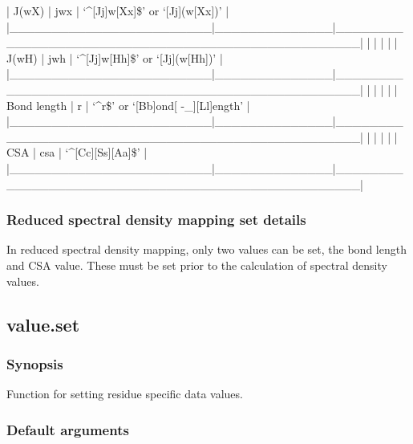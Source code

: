 | J(wX)                  | jwx          | `\^{}[Jj]w[Xx]\$' or `[Jj](w[Xx])'                   |
|\_\_\_\_\_\_\_\_\_\_\_\_\_\_\_\_\_\_\_\_\_\_\_\_|\_\_\_\_\_\_\_\_\_\_\_\_\_\_|\_\_\_\_\_\_\_\_\_\_\_\_\_\_\_\_\_\_\_\_\_\_\_\_\_\_\_\_\_\_\_\_\_\_\_\_\_\_\_\_\_\_\_\_\_\_\_\_\_\_|
|                        |              |                                                  |
| J(wH)                  | jwh          | `\^{}[Jj]w[Hh]\$' or `[Jj](w[Hh])'                   |
|\_\_\_\_\_\_\_\_\_\_\_\_\_\_\_\_\_\_\_\_\_\_\_\_|\_\_\_\_\_\_\_\_\_\_\_\_\_\_|\_\_\_\_\_\_\_\_\_\_\_\_\_\_\_\_\_\_\_\_\_\_\_\_\_\_\_\_\_\_\_\_\_\_\_\_\_\_\_\_\_\_\_\_\_\_\_\_\_\_|
|                        |              |                                                  |
| Bond length            | r            | `\^{}r\$' or `[Bb]ond[ -\_][Ll]ength'                 |
|\_\_\_\_\_\_\_\_\_\_\_\_\_\_\_\_\_\_\_\_\_\_\_\_|\_\_\_\_\_\_\_\_\_\_\_\_\_\_|\_\_\_\_\_\_\_\_\_\_\_\_\_\_\_\_\_\_\_\_\_\_\_\_\_\_\_\_\_\_\_\_\_\_\_\_\_\_\_\_\_\_\_\_\_\_\_\_\_\_|
|                        |              |                                                  |
| CSA                    | csa          | `\^{}[Cc][Ss][Aa]\$'                                 |
|\_\_\_\_\_\_\_\_\_\_\_\_\_\_\_\_\_\_\_\_\_\_\_\_|\_\_\_\_\_\_\_\_\_\_\_\_\_\_|\_\_\_\_\_\_\_\_\_\_\_\_\_\_\_\_\_\_\_\_\_\_\_\_\_\_\_\_\_\_\_\_\_\_\_\_\_\_\_\_\_\_\_\_\_\_\_\_\_\_|



\subsubsection{Reduced spectral density mapping set details}

In reduced spectral density mapping, only two values can be set, the bond length and CSA
value.  These must be set prior to the calculation of spectral density values.


\newpage

\subsection{value.set}


\subsubsection{Synopsis}

Function for setting residue specific data values.

\subsubsection{Default arguments}

